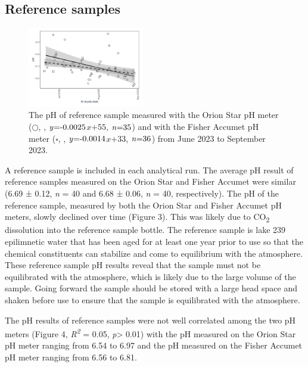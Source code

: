 \documentclass[
]{article}
\DeclareRobustCommand{\solidline}{\raisebox{2pt}{\tikz{\draw[thick](0,0) -- (0.5,0);}}}
\DeclareRobustCommand{\dashedline}{\raisebox{2pt}{\tikz{\draw[dashed, thick](0,0) -- (0.5,0);}}}
\begin{document}
\subsection{Reference samples}

\begin{figure}
  \vspace{-0.7cm}
  \includegraphics[width=0.45\textwidth]{ref_comparison_date.pdf}
  \caption{The pH of reference sample measured with the Orion Star pH meter ($\bigcirc$, \protect\solidline, $\mbox{\textit{y}=-0.0025}$$\textit{x}$$+$$\mbox{55}$, $\mbox{\textit{n}=35}$) and with the Fisher Accumet pH meter ($\square$, \protect\dashedline, $\mbox{\textit{y}=-0.0014}$$\textit{x}$$+$$\mbox{33}$, $\mbox{\textit{n}=36}$) from June 2023 to September 2023.}
\end{figure}

A reference sample is included in each analytical run. The average pH
result of reference samples measured on the Orion Star and Fisher
Accumet were similar (6.69 ± 0.12, \emph{n} = 40 and 6.68 ± 0.06,
\emph{n} = 40, respectively). The pH of the reference sample, measured
by both the Orion Star and Fisher Accumet pH meters, slowly declined
over time (Figure 3). This was likely due to CO\textsubscript{2}
dissolution into the reference sample bottle. The reference sample is
lake 239 epilimnetic water that has been aged for at least one year
prior to use so that the chemical constituents can stabilize and come to
equilibrium with the atmosphere. These reference sample pH results
reveal that the sample must not be equilibrated with the atmosphere,
which is likely due to the large volume of the sample. Going forward the
sample should be stored with a large head space and shaken before use to
ensure that the sample is equilibrated with the atmosphere.

The pH results of reference samples were not well correlated among the
two pH meters (Figure 4, \emph{R\textsuperscript{2}} = 0.05,
\emph{p}\textgreater{} 0.01) with the pH measured on the Orion Star pH
meter ranging from 6.54 to 6.97 and the pH measured on the Fisher
Accumet pH meter ranging from 6.56 to 6.81.
\end{document}

